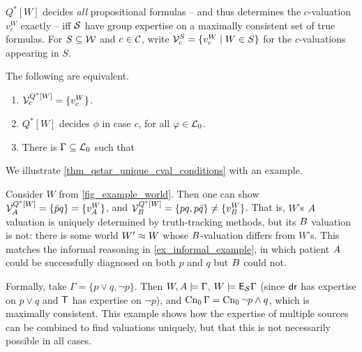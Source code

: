 $Q^*[W]$ decides \emph{all} propositional formulas -- and thus determines the
$c$-valuation $v^W_c$ exactly -- iff $\mathcal{S}$ have group expertise on a
maximally consistent set of true formulas. For $S \subseteq \mathcal{W}$ and $c \in
\mathcal{C}$, write $\mathcal{V}^S_c = \{v^W_c \mid W \in S\}$ for the $c$-valuations
appearing in $S$.

\begin{theorem}
    \label{thm_qstar_unique_cval_conditions}
    The following are equivalent.
    \begin{enumerate}
        \item\label{item_uniqueval} $\mathcal{V}^{Q^*[W]}_c = \{v^W_c\}$.
        \item\label{item_define_all_phi} $Q^*[W]$ decides $\phi$ in case $c$,
            for all $\varphi \in \mathcal{L}_0$.
        \item\label{item_mcs_gamma} There is $\Gamma \subseteq \mathcal{L}_0$ such
            that
    \end{enumerate}
\end{theorem}

We illustrate \cref{thm_qstar_unique_cval_conditions} with an example.

\begin{example}
    \label{ex_qstar_unique_cval_conditions}
    Consider $W$ from \cref{fig_example_world}.
    Then one can show $\mathcal{V}^{Q^*[W]}_{A{}} = \{\bar{p}q\} =
    \{v^W_{A{}}\}$, and $\mathcal{V}^{Q^*[W]}_{B{}} = \{pq,
    p\bar{q}\} \ne \{v^W_{B{}}\}$. That is, $W$'s $A{}$
    valuation is uniquely determined by truth-tracking methods, but its
    $B{}$ valuation is not: there is some world $W' \approx W$ whose
    $B{}$-valuation differs from $W$'s. This matches the informal
    reasoning in \cref{ex_informal_example}, in which patient $A{}$
    could be successfully diagnosed on both $p$ and $q$ but $B{}$ could
    not.

    Formally, take $\Gamma = \{p \lor q, \neg p\}$. Then $W, A{}
    \models \Gamma$, $W \models \mathsf{E}_{\mathcal{S}}{\Gamma}$ (since $\mathsf{dr}{}$ has
    expertise on $p \lor q$ and $\mathsf{T}{}$ has expertise on $\neg p$), and
    $\operatorname{Cn}_0{\Gamma} = \operatorname{Cn}_0{\neg p \land q}$, which is maximally consistent.
    This example shows how the expertise of multiple sources can be combined to
    find valuations uniquely, but that this is not necessarily possible in all
    cases.

\end{example}

